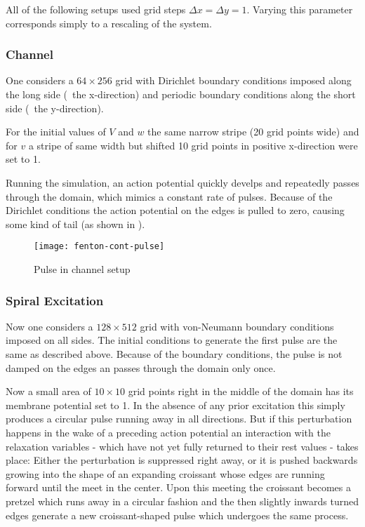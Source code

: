 All of the following setups used grid steps $\Delta{x}=\Delta{y}=1$. Varying
this parameter corresponds simply to a rescaling of the system.


\subsubsection{Channel}
\label{sec:channel}
One considers a $64\times256$ grid with Dirichlet boundary conditions imposed
along the long side (\ie~the x-direction) and periodic boundary conditions
along the short side (\ie~the y-direction).

For the initial values of $V$ and $w$ the same narrow stripe (20 grid points
wide) and for $v$ a stripe of same width but shifted 10 grid points in positive
x-direction were set to 1.

Running the simulation, an action potential quickly develps and repeatedly
passes through the domain, which mimics a constant rate of pulses. Because of
the Dirichlet conditions the action potential on the edges is pulled to zero,
causing some kind of tail (as shown in ).

\begin{figure}[h]
    \centering
    \texttt{[image: fenton-cont-pulse]}
    \label{fig:pulse}
    \caption{Pulse in channel setup}
\end{figure}


\subsubsection{Spiral Excitation}
\label{sec:spiral1}
Now one considers a $128\times512$ grid with von-Neumann boundary conditions
imposed on all sides. The initial conditions to generate the first pulse are
the same as described above. Because of the boundary conditions, the pulse is
not damped on the edges an passes through the domain only once.

Now a small area of $10\times10$ grid points right in the middle of the domain
has its membrane potential set to 1. In the absence of any prior excitation
this simply produces a circular pulse running away in all directions. But if
this perturbation happens in the wake of a preceding action potential an
interaction with the relaxation variables - which have not yet fully returned
to their rest values - takes place: Either the perturbation is suppressed right
away, or it is pushed backwards growing into the shape of an expanding
croissant whose edges are running forward until the meet in the
center. Upon this meeting the croissant becomes a pretzel which runs away in a
circular fashion and the then slightly inwards turned edges generate a new
croissant-shaped pulse which undergoes the same process.

